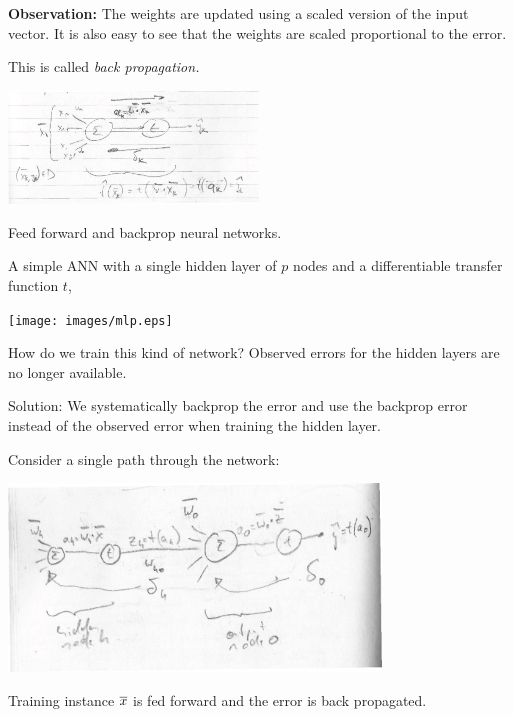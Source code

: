 \documentclass[a4paper,blends,pdf,colorBG,slideColor]{prosper}
\begin{document}
\vspace{.2in}
{\bf Observation:} The weights are updated using a scaled version of the input vector.  It is also easy to see that the weights are scaled 
proportional to the error.

This is called {\em back propagation.}

\es
{}
\begin{center}
\includegraphics[height=30mm]{images/perceptron-revisited.eps}
\end{center}

Feed forward and backprop neural networks. 
\es

A simple ANN with a single hidden layer of $p$ nodes and a differentiable transfer function $t$,

\begin{center}
\texttt{[image: images/mlp.eps]}
\end{center}

\es

How do we train this kind of network?  Observed errors for the hidden layers are no longer available.

\vspace{.2in}
Solution: We systematically backprop the error and use the backprop error instead of the observed error when training the
hidden layer.  
\es

Consider a single path through the network:
\begin{center}
\includegraphics[height=50mm]{images/mlp-single-path.eps}
\end{center}
Training instance $\overline{x}$ is fed forward and the error is back propagated.
\es
\end{document}
